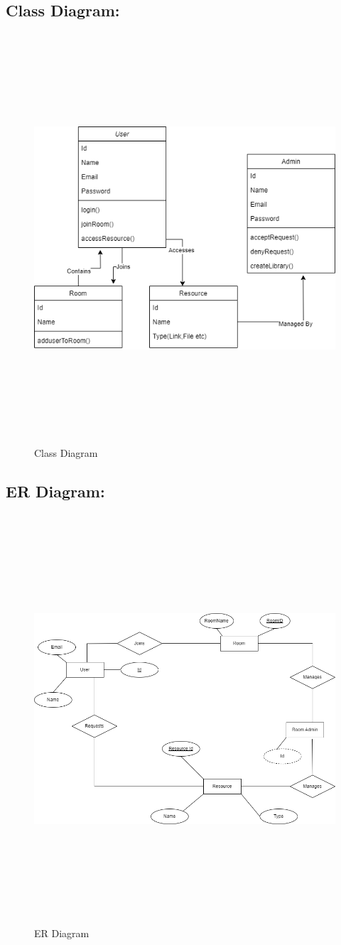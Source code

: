 \subsection{Class Diagram:}
\begin{figure}[h]
    \centering
    \includegraphics[width=6in, height=6in]{Proposal/static/Class_Diagram.png}
    \caption{Class Diagram}
    \label{fig:enter-label}
\end{figure}
\newpage

\subsection{ER Diagram:}
\begin{figure}[h]
    \centering
    \includegraphics[width=6in, height=6in]{Proposal/static/ER.png}
    \caption{ER Diagram}
    \label{fig:enter-label}
\end{figure}
\newpage